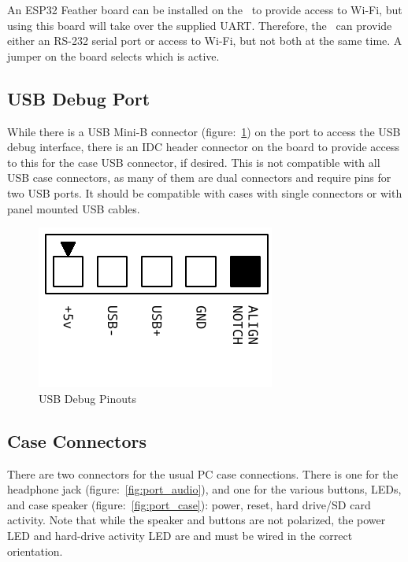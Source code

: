An ESP32 Feather board can be installed on the \fjr\ to provide access to Wi-Fi, but using this board will take over the supplied UART. Therefore, the \fjr\ can provide either an RS-232 serial port or access to Wi-Fi, but not both at the same time. A jumper on the board selects which is active.

\subsection*{USB Debug Port}

While there is a USB Mini-B connector (figure:~\ref{fig:port_usb}) on the port to access the USB debug interface, there is an IDC header connector on the board to provide access to this for the case USB connector, if desired. This is not compatible with all USB case connectors, as many of them are dual connectors and require pins for two USB ports. It should be compatible with cases with single connectors or with panel mounted USB cables.

\begin{figure}[ht]
    \begin{center}
        \includegraphics[scale=0.65]{images/f256_port_usb.pdf}
    \end{center}
    \caption{USB Debug Pinouts}
    \label{fig:port_usb}
\end{figure}

\subsection*{Case Connectors}

There are two connectors for the usual PC case connections. There is one for the headphone jack (figure:~\ref{fig:port_audio}), and one for the various buttons, LEDs, and case speaker (figure:~\ref{fig:port_case}): power, reset, hard drive/SD card activity. Note that while the speaker and buttons are not polarized, the power LED and hard-drive activity LED are and must be wired in the correct orientation.

